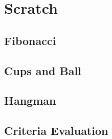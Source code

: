\section{Scratch}
\label{sec:scratch}


\subsection{Fibonacci}

\subsection{Cups and Ball}

\subsection{Hangman}


\subsection{Criteria Evaluation}